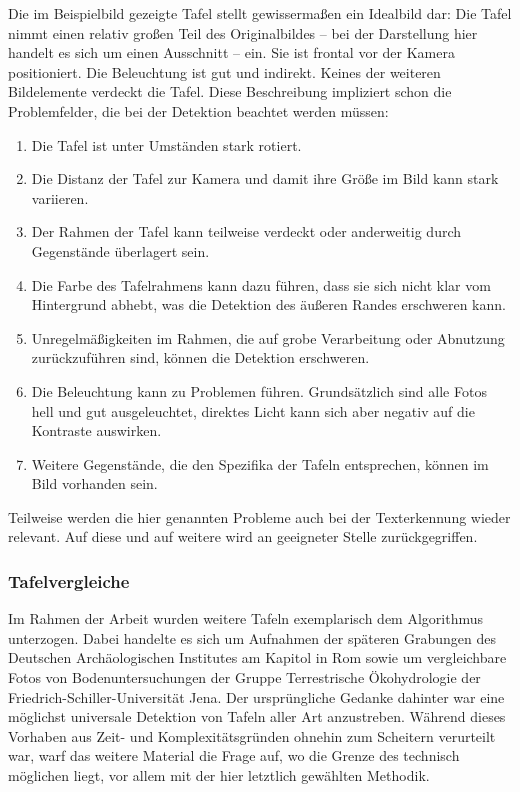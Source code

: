 Die im Beispielbild gezeigte Tafel stellt gewissermaßen ein Idealbild dar: Die Tafel nimmt einen relativ großen Teil des Originalbildes -- bei der Darstellung hier handelt es sich um einen Ausschnitt -- ein. Sie ist frontal vor der Kamera positioniert. Die Beleuchtung ist gut und indirekt. Keines der weiteren Bildelemente verdeckt die Tafel.
Diese Beschreibung impliziert schon die Problemfelder, die bei der Detektion beachtet werden müssen:
\begin{enumerate}
\item Die Tafel ist unter Umständen stark rotiert.
\item Die Distanz der Tafel zur Kamera und damit ihre Größe im Bild kann stark variieren.
\item Der Rahmen der Tafel kann teilweise verdeckt oder anderweitig durch Gegenstände überlagert sein.
\item Die Farbe des Tafelrahmens kann dazu führen, dass sie sich nicht klar vom Hintergrund abhebt, was die Detektion des äußeren Randes erschweren kann.
\item Unregelmäßigkeiten im Rahmen, die auf grobe Verarbeitung oder Abnutzung zurückzuführen sind, können die Detektion erschweren.
\item Die Beleuchtung kann zu Problemen führen. Grundsätzlich sind alle Fotos hell und gut ausgeleuchtet, direktes Licht kann sich aber negativ auf die Kontraste auswirken.
\item Weitere Gegenstände, die den Spezifika der Tafeln entsprechen, können im Bild vorhanden sein.
\end{enumerate}

Teilweise werden die hier genannten Probleme auch bei der Texterkennung wieder relevant. Auf diese und auf weitere wird an geeigneter Stelle zurückgegriffen.

\subsubsection{Tafelvergleiche}

Im Rahmen der Arbeit wurden weitere Tafeln exemplarisch dem Algorithmus unterzogen. Dabei handelte es sich um Aufnahmen der späteren Grabungen des Deutschen Archäologischen Institutes am Kapitol in Rom sowie um vergleichbare Fotos von Bodenuntersuchungen der Gruppe Terrestrische Ökohydrologie der Friedrich-Schiller-Universität Jena. Der ursprüngliche Gedanke dahinter war eine möglichst universale Detektion von Tafeln aller Art anzustreben. Während dieses Vorhaben aus Zeit- und Komplexitätsgründen ohnehin zum Scheitern verurteilt war, warf das weitere Material die Frage auf, wo die Grenze des technisch möglichen liegt, vor allem mit der hier letztlich gewählten Methodik.\\

